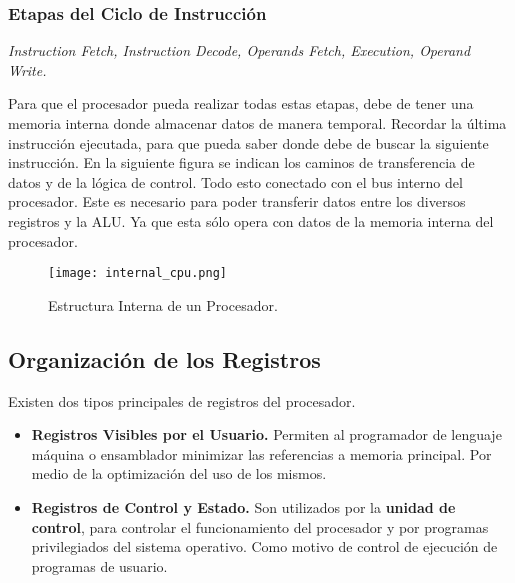 \documentclass{article}
\begin{document}
\subsubsection*{Etapas del Ciclo de Instrucci\'{o}n}
\begin{center}
      \textit{Instruction Fetch, Instruction Decode, Operands Fetch, Execution,
            Operand Write.}
\end{center}
\newpage
Para que el procesador pueda realizar todas estas etapas, debe de tener una memoria
interna donde almacenar datos de manera temporal. Recordar la \'{u}ltima instrucci\'{o}n
ejecutada, para que pueda saber donde debe de buscar la siguiente instrucci\'{o}n.
En la siguiente figura se indican los caminos de transferencia de datos y de la l\'{o}gica
de control. Todo esto conectado con el bus interno del procesador. Este es necesario
para poder transferir datos entre los diversos registros y la ALU. Ya que esta s\'{o}lo
opera con datos de la memoria interna del procesador.
\begin{figure}[ht]
      \centering
      \texttt{[image: internal\_cpu.png]}
      \caption{Estructura Interna de un Procesador.
            \cite{stallings2006organización}}
      \label{fig:structure-and-function-cpu-1}
\end{figure}

\subsection*{Organizaci\'{o}n de los Registros}
Existen dos tipos principales de registros del procesador.

\begin{itemize}
      \item \textbf{Registros Visibles por el Usuario.}
            Permiten al programador de lenguaje m\'{a}quina o ensamblador minimizar
            las referencias a memoria principal. Por medio de la optimizaci\'{o}n del
            uso de los mismos.
      \item \textbf{Registros de Control y Estado.}
            Son utilizados por la \textbf{unidad de control}, para controlar el
            funcionamiento del procesador y por programas privilegiados del sistema
            operativo. Como motivo de control de ejecuci\'{o}n de programas de usuario.
\end{itemize}
\end{document}

